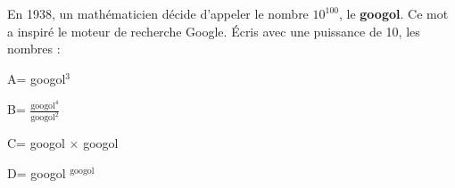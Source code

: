 
En 1938, un mathématicien décide d'appeler le nombre $10^{100}$, le \textbf{googol}. Ce mot a inspiré le moteur de recherche Google. Écris avec une puissance de 10, les nombres :

\begin{description}
\begin{minipage}{0.49\linewidth}
\item A= googol$^3$
\item B= $\frac{\text{googol}^4}{\text{googol}^2}$
\end{minipage}
\hfill
\begin{minipage}{0.49\linewidth}
\item C= googol $\times $ googol
\item D= googol $^{\text{googol}}$  
\end{minipage}


\end{description}

